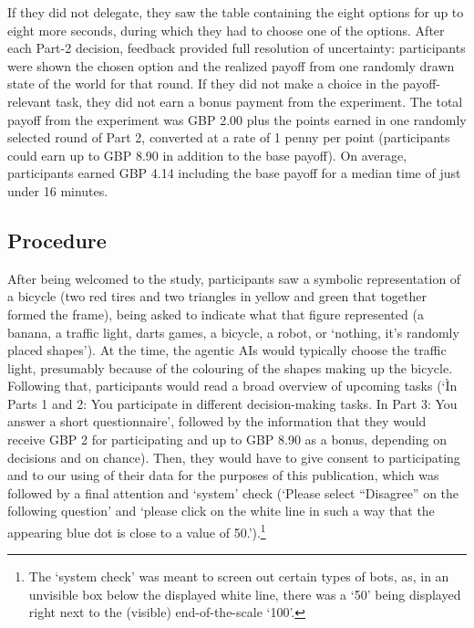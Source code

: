 \documentclass[a4paper, 12pt, fleqn]{article}
\theoremstyle{definition}
\begin{document}
If they did not delegate, they saw the table containing the eight options for up to eight more seconds, during which they had to choose one of the options. After each Part-2 decision, feedback provided full resolution of uncertainty: participants were shown the chosen option and the realized payoff from one randomly drawn state of the world for that round. If they did not make a choice in the payoff-relevant task, they did not earn a bonus payment from the experiment. The total payoff from the experiment was GBP 2.00 plus the points earned in one randomly selected round of Part 2, converted at a rate of 1 penny per point (participants could earn up to GBP 8.90 in addition to the base payoff). On average, participants earned GBP 4.14 including the base payoff for a median time of just under 16 minutes.

\subsection{Procedure}
After being welcomed to the study, participants saw a symbolic representation of a bicycle (two red tires and two triangles in yellow and green that together formed the frame), being asked to indicate what that figure represented (a banana, a traffic light, darts games, a bicycle, a robot, or `nothing, it's randomly placed shapes'). At the time, the agentic AIs would typically choose the traffic light, presumably because of the colouring of the shapes making up the bicycle. Following that, participants would read a broad overview of upcoming tasks (`Ìn Parts 1 and 2: You participate in different decision-making tasks. In Part 3: You answer a short questionnaire', followed by the information that they would receive GBP 2 for participating and up to GBP 8.90 as a bonus, depending on decisions and on chance). Then, they would have to give consent to participating and to our using of their data for the purposes of this publication, which was followed by a final 
attention and `system' check (`Please select ``Disagree'' on the following question' and `please click on the white line in such a way that the appearing blue dot is close to a value of 50.').\footnote{The `system check' was meant to screen out certain types of bots, as, in an unvisible box below the displayed white line, there was a `50' being displayed right next to the (visible) end-of-the-scale `100'.}
\end{document}
